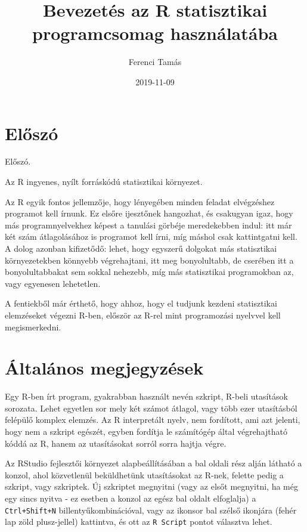 \documentclass[]{book}
\title{Bevezetés az R statisztikai programcsomag használatába}
\author{Ferenci Tamás}
\date{2019-11-09}
\begin{document}
\maketitle

{
\setcounter{tocdepth}{1}
\tableofcontents
}
\hypertarget{elux151szuxf3}{%
\chapter{Előszó}\label{elux151szuxf3}}

Előszó.

Az R ingyenes, nyílt forráskódú statisztikai környezet.

Az R egyik fontos jellemzője, hogy lényegében minden feladat elvégzéshez programot kell írnunk. Ez elsőre ijesztőnek hangozhat, és csakugyan igaz, hogy más programnyelvekhez képest a tanulási görbéje meredekebben indul: itt már két szám átlagolásához is programot kell írni, míg máshol csak kattintgatni kell. A dolog azonban kifizetődő: lehet, hogy egyszerű dolgokat más statisztikai környezetekben könnyebb végrehajtani, itt meg bonyolultabb, de cserében itt a bonyolultabbakat sem sokkal nehezebb, míg más statisztikai programokban az, vagy egyenesen lehetetlen.

A fentiekből már érthető, hogy ahhoz, hogy el tudjunk kezdeni statisztikai elemzéseket végezni R-ben, először az R-rel mint programozási nyelvvel kell megismerkedni.

\hypertarget{uxe1ltaluxe1nos-megjegyzuxe9sek}{%
\chapter{Általános megjegyzések}\label{uxe1ltaluxe1nos-megjegyzuxe9sek}}

Egy R-ben írt program, gyakrabban használt nevén szkript, R-beli utasítások sorozata. Lehet egyetlen sor mely két számot átlagol, vagy több ezer utasításból felépülő komplex elemzés. Az R interpretált nyelv, nem fordított, ami azt jelenti, hogy nem a szkript egészét, egyben fordítja le számítógép által végrehajtható kóddá az R, hanem az utasításokat sorról sorra hajtja végre.

Az RStudio fejlesztői környezet alapbeállításában a bal oldali rész alján látható a konzol, ahol közvetlenül beküldhetünk utasításokat az R-nek, felette pedig a szkript, vagy szkriptek. Új szkriptet megnyitni (vagy az elsőt megnyitni, ha még egy sincs nyitva - ez esetben a konzol az egész bal oldalt elfoglalja) a \texttt{Ctrl+Shift+N} billentyűkombinációval, vagy az ikonsor bal szélső ikonjára (fehér lap zöld plusz-jellel) kattintva, és ott az \texttt{R\ Script} pontot választva lehet.
\end{document}
